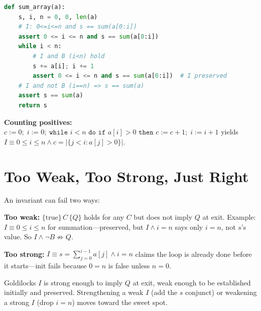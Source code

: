 \begin{lstlisting}[language=Python, caption={Summation with invariant as executable assertion: fails loudly if discovery is wrong.}, label={lst:sum-invariant}]
def sum_array(a):
    s, i, n = 0, 0, len(a)
    # I: 0<=i<=n and s == sum(a[0:i])
    assert 0 <= i <= n and s == sum(a[0:i])
    while i < n:
        # I and B (i<n) hold
        s += a[i]; i += 1
        assert 0 <= i <= n and s == sum(a[0:i])  # I preserved
    # I and not B (i==n) => s == sum(a)
    assert s == sum(a)
    return s
\end{lstlisting}

\textbf{Counting positives:} $c:=0;\;i:=0;\;\texttt{while }i<n\texttt{ do if }a[i]>0\texttt{ then }c:=c+1;\;i:=i+1$ yields $I\equiv 0\le i\le n\land c = |\{j < i : a[j]>0\}|$.

\section{Too Weak, Too Strong, Just Right}
\label{sec:weak-strong}
An invariant can fail two ways:

\textbf{Too weak:} $\{ \text{true}\}\,C\,\{Q\}$ holds for any $C$ but does not imply $Q$ at exit. Example: $I\equiv 0\le i\le n$ for summation—preserved, but $I\land i=n$ says only $i=n$, not $s$'s value. So $I\land\neg B\not\Rightarrow Q$.

\textbf{Too strong:} $I\equiv s=\sum_{j=0}^{i-1}a[j]\land i=n$ claims the loop is already done before it starts—init fails because $0=n$ is false unless $n=0$.

Goldilocks $I$ is strong enough to imply $Q$ at exit, weak enough to be established initially and preserved. Strengthening a weak $I$ (add the $s$ conjunct) or weakening a strong $I$ (drop $i=n$) moves toward the sweet spot.

